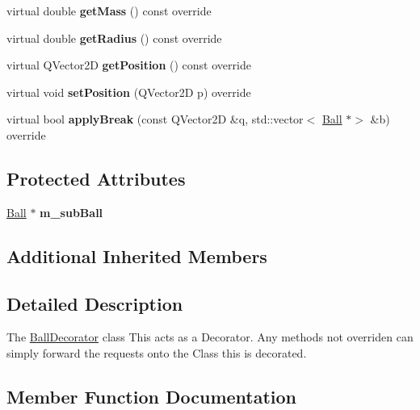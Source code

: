 \begin{DoxyCompactItemize}
\mbox{\label{class_ball_decorator_acf6892e513f9dc01bb6f87028e8ca9d5}} 
virtual double {\bfseries get\+Mass} () const override
\item 
\mbox{\label{class_ball_decorator_af842f5b568d3baa21fd68bb4ede7068a}} 
virtual double {\bfseries get\+Radius} () const override
\item 
\mbox{\label{class_ball_decorator_a40b5df839e4f1aaec4ee792749757848}} 
virtual Q\+Vector2D {\bfseries get\+Position} () const override
\item 
\mbox{\label{class_ball_decorator_aad7c3ecc4449881048f8610ecc73ec31}} 
virtual void {\bfseries set\+Position} (Q\+Vector2D p) override
\item 
\mbox{\label{class_ball_decorator_a6c11bb4c2a4accb0167a71c8a5cc5ea7}} 
virtual bool {\bfseries apply\+Break} (const Q\+Vector2D \&q, std\+::vector$<$ \mbox{\hyperlink{class_ball}{Ball}} $\ast$$>$ \&b) override
\end{DoxyCompactItemize}
\subsection*{Protected Attributes}
\begin{DoxyCompactItemize}
\item 
\mbox{\label{class_ball_decorator_ab002bec02e2638a0c600c467f51e27f3}} 
\mbox{\hyperlink{class_ball}{Ball}} $\ast$ {\bfseries m\+\_\+sub\+Ball}
\end{DoxyCompactItemize}
\subsection*{Additional Inherited Members}


\subsection{Detailed Description}
The \mbox{\hyperlink{class_ball_decorator}{Ball\+Decorator}} class This acts as a Decorator. Any methods not overriden can simply forward the requests onto the Class this is decorated. 

\subsection{Member Function Documentation}
\mbox{\label{class_ball_decorator_a3e4f4d31f6409f018b8b337bcf2bd284}} 
